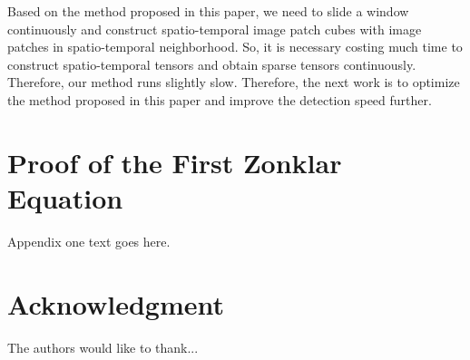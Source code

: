 \documentclass[journal]{IEEEtran}
\begin{document}
Based on the method proposed in this paper, we need to slide a window continuously and construct spatio-temporal image patch cubes with image patches in spatio-temporal neighborhood. So, it is necessary costing much time to construct spatio-temporal tensors and obtain sparse tensors continuously. Therefore, our method runs slightly slow. Therefore, the next work is to optimize the method proposed in this paper and improve the detection speed further.






%


\appendices
\section{Proof of the First Zonklar Equation}
Appendix one text goes here.

\section*{Acknowledgment}
The authors would like to thank...


\ifCLASSOPTIONcaptionsoff
  \newpage
\fi
\end{document}
